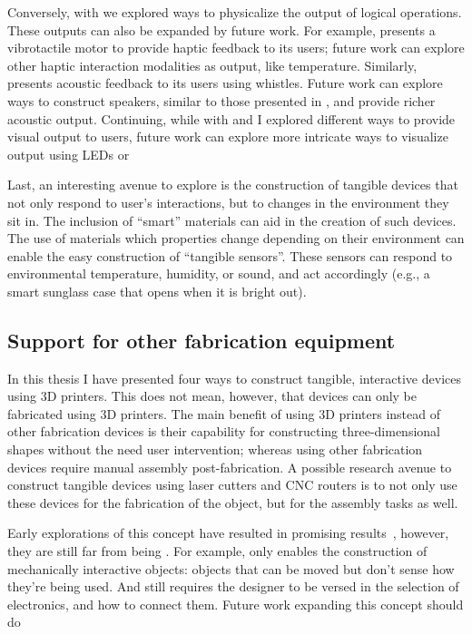       Conversely, with \al we explored ways to physicalize the output of logical
      operations. These outputs can also be expanded by future work. For
      example, \al presents a vibrotactile motor to provide haptic feedback to
      its users; future work can explore other haptic interaction modalities as
      output, like temperature. Similarly, \al presents acoustic feedback to its
      users using whistles. Future work can explore \pap ways to construct
      speakers, similar to those presented in \cite{Ishiguro:2014}, and provide
      richer acoustic output. Continuing, while with \al and \mp I explored
      different ways to provide visual output to users, future work can explore
      more intricate ways to visualize output using LEDs or 

      Last, an interesting avenue to explore is the construction of tangible
      devices that not only respond to user's interactions, but to changes in
      the environment they sit in. The inclusion of ``smart'' materials can aid
      in the creation of such devices. The use of materials which properties
      change depending on their environment can enable the easy construction of
      ``tangible sensors''. These sensors can respond to environmental
      temperature, humidity, or sound, and act accordingly (e.g., a smart
      sunglass case that opens when it is bright out).

    \subsection{Support for other fabrication equipment}
      In this thesis I have presented four \pap ways to construct tangible,
      interactive devices using 3D printers. This does not mean, however, that
      \pap devices can only be fabricated using 3D printers. The main benefit of
      using 3D printers instead of other fabrication devices is their capability
      for constructing three-dimensional shapes without the need user
      intervention; whereas using other fabrication devices require manual
      assembly post-fabrication. A possible research avenue to construct
      tangible devices using laser cutters and CNC routers is to not only use
      these devices for the fabrication of the object, but for the assembly
      tasks as well. 

      Early explorations of this concept have resulted in promising
      results~\cite{Katakura:2019, Nisser:2021}, however, they are still far
      from being \pap. For example, \cite{Katakura:2019} only enables the
      construction of mechanically interactive objects: objects that can be
      moved but don't sense how they're being used. And \cite{Nisser:2021} still
      requires the designer to be versed in the selection of electronics, and
      how to connect them. Future work expanding this concept should do
